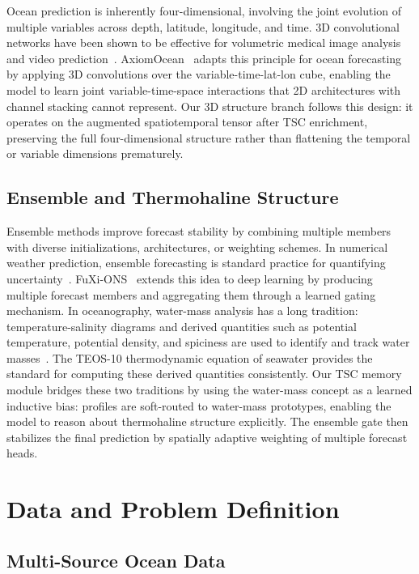 \documentclass[conference]{IEEEtran}
\begin{document}
Ocean prediction is inherently four-dimensional, involving the joint evolution of multiple variables across depth, latitude, longitude, and time. 3D convolutional networks have been shown to be effective for volumetric medical image analysis~\cite{cicek20163d} and video prediction~\cite{tran2015learning}. AxiomOcean~\cite{wuAxiomOceanForecastingThreeDimensional2026} adapts this principle for ocean forecasting by applying 3D convolutions over the variable-time-lat-lon cube, enabling the model to learn joint variable-time-space interactions that 2D architectures with channel stacking cannot represent. Our 3D structure branch follows this design: it operates on the augmented spatiotemporal tensor after TSC enrichment, preserving the full four-dimensional structure rather than flattening the temporal or variable dimensions prematurely.

\subsection{Ensemble and Thermohaline Structure}

Ensemble methods improve forecast stability by combining multiple members with diverse initializations, architectures, or weighting schemes. In numerical weather prediction, ensemble forecasting is standard practice for quantifying uncertainty~\cite{molteni1996ecmwf}. FuXi-ONS~\cite{huangFuXiONSDataDrivenEnsemble2026} extends this idea to deep learning by producing multiple forecast members and aggregating them through a learned gating mechanism. In oceanography, water-mass analysis has a long tradition: temperature-salinity diagrams and derived quantities such as potential temperature, potential density, and spiciness are used to identify and track water masses~\cite{flament2002state}. The TEOS-10 thermodynamic equation of seawater provides the standard for computing these derived quantities consistently. Our TSC memory module bridges these two traditions by using the water-mass concept as a learned inductive bias: profiles are soft-routed to water-mass prototypes, enabling the model to reason about thermohaline structure explicitly. The ensemble gate then stabilizes the final prediction by spatially adaptive weighting of multiple forecast heads.

\section{Data and Problem Definition}

\subsection{Multi-Source Ocean Data}
\end{document}
